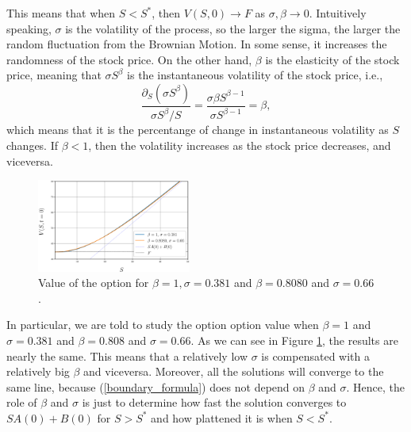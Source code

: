 This means that when $S < S^*$, then $V(S,0) \to F$ as $\sigma, \beta\to0$. Intuitively speaking, $\sigma$ is the volatility of the process, so the larger the sigma, the larger the random fluctuation from the Brownian Motion. In some sense, it increases the randomness of the stock price. On the other hand, $\beta$ is the elasticity of the stock price, meaning that $\sigma S^\beta$ is the instantaneous volatility of the stock price, i.e., 
\begin{equation}
	\frac{\partial_S \left(\sigma S^\beta\right)}{\sigma S^{\beta}/S} =\frac{\sigma \beta S^{\beta-1}}{\sigma S^{\beta-1}} = \beta,
\end{equation}
which means that it is the percentange of change in instantaneous volatility as $S$ changes. If $\beta < 1$, then the volatility increases as the stock price decreases, and viceversa.
\begin{figure}[htbp]
	\centering
	\includegraphics[width=0.45\textwidth]{img/Q1/ComparisonGivenBetaAndSigma.eps}
	\captionsetup{width=.5\linewidth}
	\caption{Value of the option for $\beta=1, \sigma=0.381$ and $\beta=0.8080$ and $\sigma=0.66$.}
	\label{givenBetaSigma}
\end{figure}

In particular, we are told to study the option option value when $\beta=1$ and $\sigma = 0.381$ and $\beta=0.808$ and $\sigma=0.66$. As we can see in Figure \ref{givenBetaSigma}, the results are nearly the same. This means that a relatively low $\sigma$ is compensated with a relatively big $\beta$ and viceversa. Moreover, all the solutions will converge to the same line, because  (\ref{boundary_formula}) does not depend on $\beta$ and $\sigma$. Hence, the role of $\beta$ and $\sigma$ is just to determine how fast the solution converges to $SA(0) + B(0)$ for $S>S^*$ and how plattened it is when $S<S^*$.


